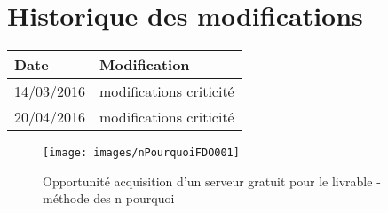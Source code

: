 \section*{Historique des modifications}
\begin{table}[h]
\centering
	\begin{tabularx}{16.8cm}{|X|X|}
	\hline
	\rowcolor{gray!40} Date & Modification \\
	\hline
	 14/03/2016 & modifications criticité \\
	\hline
	 20/04/2016 & modifications criticité \\
	\hline
	\end{tabularx}
\end{table}
\newpage


\begin{figure}
	\centering
	\texttt{[image: images/nPourquoiFDO001]}
	\caption{\label{opportunite acquisition d'un serveur gratuit pour le livrable}Opportunité acquisition d'un serveur gratuit pour le livrable - méthode des n pourquoi}
\end{figure}
